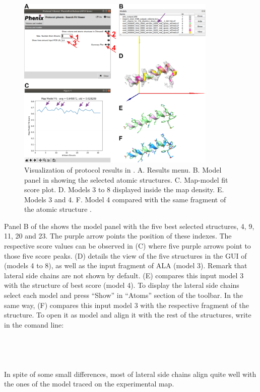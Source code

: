   \begin{figure}[H]
  \centering 
  \captionsetup{width=.9\linewidth} 
  \includegraphics[width=0.85\textwidth]{Images/Fig_search_fit_4.pdf}
  \caption{Visualization of  protocol results in \scipion. A. Results menu. B. Model panel in \chimera showing the selected atomic structures. C. Map-model fit score plot. D. Models 3 to 8 displayed inside the map density. E. Models 3 and 4. F. Model 4 compared with the same fragment of the atomic structure .}
  \label{fig:phenix_search_fit_4}
  \end{figure}
  
  Panel B of the  shows the \chimerax model panel with the five best selected structures, 4, 9, 11, 20 and 23. The purple arrow points the position of these indexes. The respective score values can be observed in  (C) where five purple arrows point to those five score peaks.  (D) details the view of the five structures in the GUI of \chimera (models 4 to 8), as well as the input fragment of ALA (model 3). Remark that lateral side chains are not shown by default.  (E) compares this input model 3 with the structure of best score (model 4). To display the lateral side chains select each model and press ``Show'' in ``Atoms'' section of the toolbar. In the same way,  (F) compares this input model 3 with the respective fragment of the  structure. To open it as model  and align it with the rest of the structures, write in the \chimera comand line:\\
  \\
  \\
  \\
  \\
  In spite of some small differences, most of lateral side chains align quite well with the ones of the model  traced on the experimental map.
  
